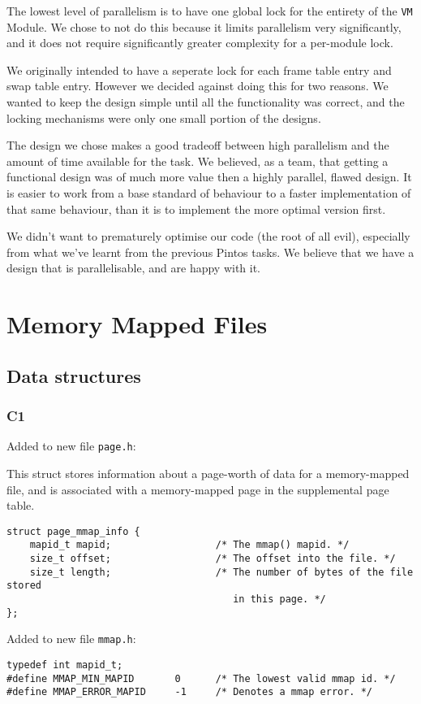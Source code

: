 \documentclass[a4wide, 11pt]{article}
\newcommand{\tx}{\texttt}
\begin{document}
The lowest level of parallelism is to have one global lock for the entirety of the \tx{VM} Module. We chose to not do this because it limits parallelism very significantly, and it does not require significantly greater complexity for a per-module lock.

We originally intended to have a seperate lock for each frame table entry and swap table entry. However we decided against doing this for two reasons. We wanted to keep the design simple until all the functionality was correct, and the locking mechanisms were only one small portion of the designs.

The design we chose makes a good tradeoff between high parallelism and the amount of time available for the task. We believed, as a team, that getting a functional design was of much more value then a highly parallel, flawed design. It is easier to work from a base standard of behaviour to a faster implementation of that same behaviour, than it is to implement the more optimal version first.

We didn't want to prematurely optimise our code (the root of all evil), especially from what we've learnt from the previous Pintos tasks. We believe that we have a design that is parallelisable, and are happy with it.

\section{Memory Mapped Files}
\subsection{Data structures}
\subsubsection{C1}
Added to new file \tx{page.h}:

This struct stores information about a page-worth of data for a memory-mapped file, and is associated with a memory-mapped page in the supplemental page table.
\begin{verbatim}
struct page_mmap_info {
    mapid_t mapid;                  /* The mmap() mapid. */
    size_t offset;                  /* The offset into the file. */
    size_t length;                  /* The number of bytes of the file stored
                                       in this page. */
};
\end{verbatim}

Added to new file \tx{mmap.h}:
\begin{verbatim}
typedef int mapid_t;
#define MMAP_MIN_MAPID       0      /* The lowest valid mmap id. */
#define MMAP_ERROR_MAPID     -1     /* Denotes a mmap error. */
\end{verbatim}
\end{document}
